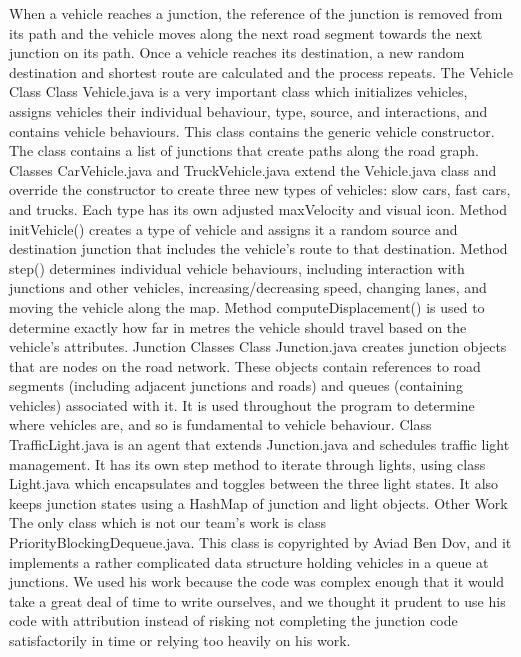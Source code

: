 \documentclass[11pt]{article}
\begin{document}
When a vehicle reaches a junction, the reference of the junction is removed from its path and the vehicle moves along the next road segment towards the next junction on its path. Once a vehicle reaches its destination, a new random destination and shortest route are calculated and the process repeats.
The Vehicle Class
Class Vehicle.java is a very important class which initializes vehicles, assigns vehicles their individual behaviour, type, source, and interactions, and contains vehicle behaviours. This class contains the generic vehicle constructor. The class contains a list of junctions that create paths along the road graph. 
Classes CarVehicle.java and TruckVehicle.java extend the Vehicle.java class and override the constructor to create three new types of vehicles: slow cars, fast cars, and trucks. Each type has its own adjusted maxVelocity and visual icon. 
Method initVehicle() creates a type of vehicle and assigns it a random source and destination junction that includes the vehicle’s route to that destination. 
Method step() determines individual vehicle behaviours, including interaction with junctions and other vehicles, increasing/decreasing speed, changing lanes, and moving the vehicle along the map. 
Method computeDisplacement() is used to determine exactly how far in metres the vehicle should travel based on the vehicle’s attributes. 
Junction Classes
Class Junction.java creates junction objects that are nodes on the road network. These objects contain references to road segments (including adjacent junctions and roads) and queues (containing vehicles) associated with it. It is used throughout the program to determine where vehicles are, and so is fundamental to vehicle behaviour.
Class TrafficLight.java is an agent that extends Junction.java and schedules traffic light management. It has its own step method to iterate through lights, using class Light.java which encapsulates and toggles between the three light states. It also keeps junction states using a HashMap of junction and light objects. 
Other Work
The only class which is not our team’s work is class PriorityBlockingDequeue.java. This class is copyrighted by Aviad Ben Dov, and it implements a rather complicated data structure holding vehicles in a queue at junctions. We used his work because the code was complex enough that it would take a great deal of time to write ourselves, and we thought it prudent to use his code with attribution instead of risking not completing the junction code satisfactorily in time or relying too heavily on his work.
\end{document}
